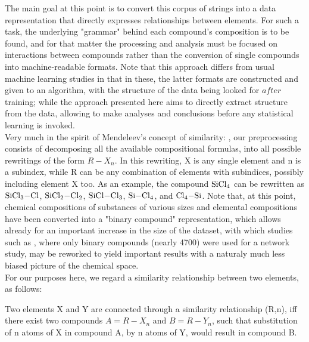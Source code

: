 \documentclass[article]{article}
\begin{document}
The main goal at this point is to convert this corpus of strings into a data representation that directly expresses relationships between elements. For such a task, the underlying "grammar" behind each compound's composition is to be found, and for that matter the processing and analysis must be focused on interactions between compounds rather than the conversion of single compounds into machine-readable formats. Note that this approach differs from usual machine learning studies in that in these, the latter formats are constructed and given to an algorithm, with the structure of the data being looked for $\textit{after}$ training; while the  approach presented here aims to directly extract structure from the data, allowing to make analyses and conclusions before any statistical learning is invoked.\\

Very much in the spirit of Mendeleev's concept of similarity: , our preprocessing consists of decomposing all the available compositional formulas, into all possible rewritings of the form $R-X_n$. In this rewriting, X is any single element and n is a subindex, while R can be any combination of elements with subindices, possibly including element X too. As an example, the compound $\ce{SiCl4}$ can be rewritten as $\ce{SiCl3-Cl}$, $\ce{SiCl2-Cl2}$, $\ce{SiCl-Cl3}$, $\ce{Si-Cl4}$, and $\ce{Cl4-Si}$. Note that, at this point, chemical compositions of substances of various sizes and elemental compositions have been converted into a "binary compound" representation, which allows already for an important increase in the size of the dataset, with which studies such as \cite{Leal2012}, where only binary compounds (nearly 4700) were used for a network study, may be reworked to yield important results with a naturaly much less biased picture of the chemical space. \\

For our purposes here, we regard a similarity relationship between two elements, as follows:

\begin{definition}
\label{def:def1}
Two elements X and Y are connected through a similarity relationship (R,n), iff there exist two compounds $A = R-X_n$ and $B = R-Y_n$, such that substitution of n atoms of X in compound A, by n atoms of Y, would result in compound B.
\end{definition}
\end{document}
